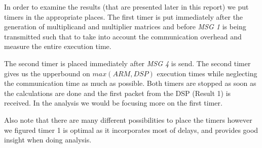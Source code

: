 In order to examine the results (that are presented later in this report) we put timers in the appropriate places. The first timer is put immediately after the generation of multiplicand and multiplier matrices and before \emph{MSG 1} is being transmitted such that to take into account the communication overhead and measure the entire execution time.

The second timer is placed immediately after \emph{MSG 4} is send. The second timer gives us the upperbound on $max(ARM, DSP)$ execution times while neglecting the communication time as much as possible. Both timers are stopped as soon as the calculations are done and the first packet from the DSP (Result 1) is received. In the analysis we would be focusing more on the first timer.

Also note that there are many different possibilities to place the timers however we figured timer 1 is optimal as it incorporates most of delays, and provides good insight when doing analysis.
